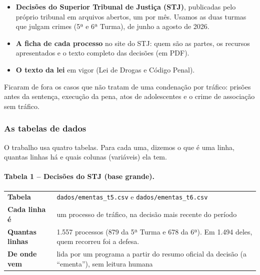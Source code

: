 \documentclass[11pt,a4paper]{article}
\newcommand{\ficha}[4]{%
\begin{center}\small
\begin{tabular}{>{\bfseries}p{3.2cm}p{11.5cm}}
\toprule
Tabela & #1 \\
Cada linha é & #2 \\
Quantas linhas & #3 \\
De onde vem & #4 \\
\bottomrule
\end{tabular}
\end{center}}
\begin{document}
\begin{itemize}
  \item \textbf{Decisões do Superior Tribunal de Justiça (STJ)}, publicadas pelo próprio
        tribunal em arquivos abertos, um por mês. Usamos as duas turmas que julgam
        crimes (5ª e 6ª Turma), de junho a agosto de 2026.
  \item \textbf{A ficha de cada processo} no site do STJ: quem são as partes, os recursos
        apresentados e o texto completo das decisões (em PDF).
  \item \textbf{O texto da lei} em vigor (Lei de Drogas e Código Penal).
\end{itemize}

Ficaram de fora os casos que não tratam de uma condenação por tráfico: prisões antes da
sentença, execução da pena, atos de adolescentes e o crime de associação sem tráfico.

\subsubsection*{As tabelas de dados}

O trabalho usa quatro tabelas. Para cada uma, dizemos o que é uma linha, quantas
linhas há e quais colunas (variáveis) ela tem.

\paragraph{Tabela 1 -- Decisões do STJ (base grande).}
\ficha{\texttt{dados/ementas\_t5.csv} e \texttt{dados/ementas\_t6.csv}}
      {um processo de tráfico, na decisão mais recente do período}
      {1.557 processos (879 da 5ª Turma e 678 da 6ª). Em 1.494 deles, quem recorreu foi a defesa.}
      {lida por um programa a partir do resumo oficial da decisão (a ``ementa''), sem leitura humana}
\end{document}

